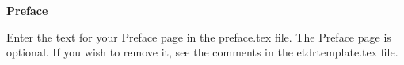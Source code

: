 
\newpage
\vspace*{0.9cm}
\begin{center}
{\bf \Huge Preface}
\end{center}

\setlength{\baselineskip}{0.8cm}



Enter the text for your Preface page in the preface.tex file. The
Preface page is optional.  If you wish to remove it, see the
comments in the etdrtemplate.tex file.
